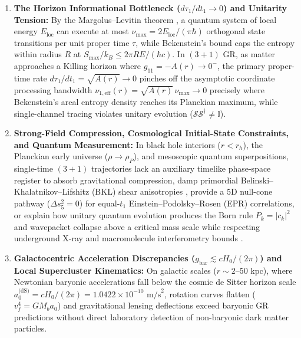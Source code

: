 \documentclass[11pt,a4paper]{article}
\theoremstyle{definition}
\theoremstyle{remark}
\begin{document}
\begin{enumerate}
  \item \textbf{The Horizon Informational Bottleneck ($d\tau_1/dt_1 \to 0$) and Unitarity Tension:} By the Margolus--Levitin theorem \cite{MargolusLevitin1998,Lloyd2000}, a quantum system of local energy $E_{\text{loc}}$ can execute at most $\nu_{\max} = 2 E_{\text{loc}}/(\pi\hbar)$ orthogonal state transitions per unit proper time $\tau$, while Bekenstein's bound \cite{Bekenstein1973,Bekenstein1981} caps the entropy within radius $R$ at $S_{\max}/k_B \le 2\pi R E/(\hbar c)$. In $(3+1)$ GR, as matter approaches a Killing horizon where $g_{11} = -A(r) \to 0^-$, the primary proper-time rate $d\tau_1/dt_1 = \sqrt{A(r)} \to 0$ pinches off the asymptotic coordinate processing bandwidth $\nu_{1,\text{eff}}(r) = \sqrt{A(r)}\,\nu_{\max} \to 0$ precisely where Bekenstein's areal entropy density reaches its Planckian maximum, while single-channel tracing violates unitary evolution ($\mathcal{S}\mathcal{S}^\dagger \neq \mathbb{I}$).
  \item \textbf{Strong-Field Compression, Cosmological Initial-State Constraints, and Quantum Measurement:} In black hole interiors ($r < r_h$), the Planckian early universe ($\rho \to \rho_P$), and mesoscopic quantum superpositions, single-time $(3+1)$ trajectories lack an auxiliary timelike phase-space register to absorb gravitational compression, damp primordial Belinski--Khalatnikov--Lifshitz (BKL) shear anisotropies \cite{JV_Paper2,JV_Paper3}, provide a 5D null-cone pathway ($\Delta s_5^2 = 0$) for equal-$t_1$ Einstein--Podolsky--Rosen (EPR) correlations, or explain how unitary quantum evolution produces the Born rule $P_k = |c_k|^2$ and wavepacket collapse above a critical mass scale while respecting underground X-ray and macromolecule interferometry bounds \cite{Fein2019,Delic2020,Donadi2021}.
  \item \textbf{Galactocentric Acceleration Discrepancies ($g_{\text{bar}} \lesssim cH_0/(2\pi)$) and Local Supercluster Kinematics:} On galactic scales ($r \sim 2\text{--}50\text{ kpc}$), where Newtonian baryonic accelerations fall below the cosmic de Sitter horizon scale $a_0^{\text{(dS)}} = cH_0/(2\pi) = 1.0422 \times 10^{-10}\text{ m/s}^2$, rotation curves flatten ($v_f^4 = G M_b a_0$) \cite{Milgrom1983,McGaugh2000,McGaugh2016,Lelli2016} and gravitational lensing deflections exceed baryonic GR predictions without direct laboratory detection of non-baryonic dark matter particles.

\end{enumerate}
\end{document}
